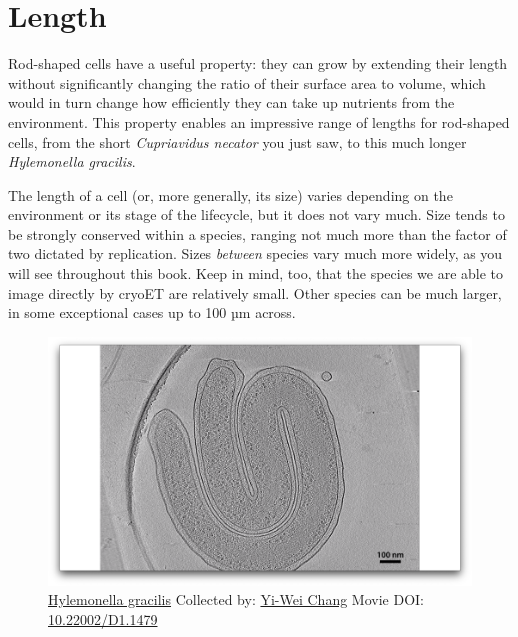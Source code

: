 \documentclass[]{tufte-book}
\begin{document}
\section{Length}\label{length}

Rod-shaped cells have a useful property: they can grow by extending
their length without significantly changing the ratio of their surface
area to volume, which would in turn change how efficiently they can take
up nutrients from the environment. This property enables an impressive
range of lengths for rod-shaped cells, from the short \emph{Cupriavidus
necator} you just saw, to this much longer \emph{Hylemonella gracilis}.

The length of a cell (or, more generally, its size) varies depending on
the environment or its stage of the lifecycle, but it does not vary
much. Size tends to be strongly conserved within a species, ranging not
much more than the factor of two dictated by replication. Sizes
\emph{between} species vary much more widely, as you will see throughout
this book. Keep in mind, too, that the species we are able to image
directly by cryoET are relatively small. Other species can be much
larger, in some exceptional cases up to 100 µm across.





\begin{figure}
\includegraphics{movie_stills/3_3} \caption[\protect\hyperlink{tree}{Hylemonella gracilis} Collected by:
\protect\hyperlink{yi-wei_chang}{Yi-Wei Chang} Movie DOI:
\href{https://doi.org/10.22002/D1.1479}{10.22002/D1.1479}]{\protect\hyperlink{tree}{Hylemonella gracilis} Collected by:
\protect\hyperlink{yi-wei_chang}{Yi-Wei Chang} Movie DOI:
\href{https://doi.org/10.22002/D1.1479}{10.22002/D1.1479}}\label{fig:3-3}
\end{figure}
\end{document}
